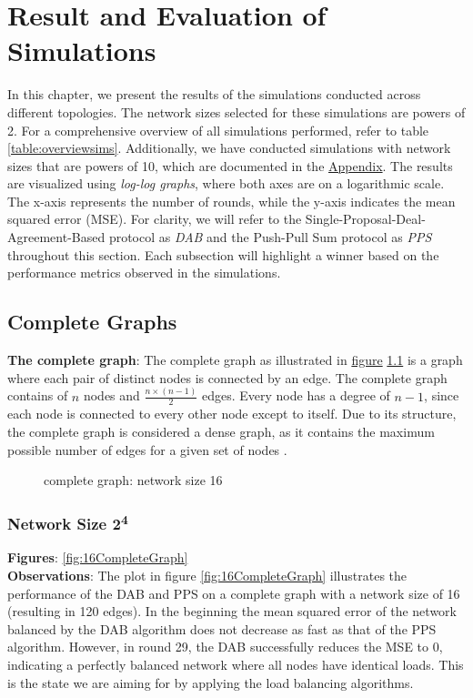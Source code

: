 \chapter{Result and Evaluation of Simulations}\label{chap:results}
In this chapter, we present the results of the simulations conducted across different topologies. The network sizes selected for these simulations are powers of 2. For a comprehensive overview of all simulations performed, refer to table \ref{table:overviewsims}. Additionally, we have conducted simulations with network sizes that are powers of 10, which are documented in the \hyperref[chap:appendix]{Appendix}.
The results are visualized using \textit{log-log graphs}, where both axes are on a logarithmic scale. The x-axis represents the number of rounds, while the y-axis indicates the mean squared error (MSE). For clarity, we will refer to the Single-Proposal-Deal-Agreement-Based protocol as \textit{DAB} and the Push-Pull Sum protocol as \textit{PPS} throughout this section. Each subsection will highlight a winner based on the performance metrics observed in the simulations.

\section{Complete Graphs}
\textbf{The complete graph}: The complete graph as illustrated in \hyperref[fig:completegraphDemo]{figure} \ref{fig:completegraphDemo} is a graph where each pair of distinct nodes is connected by an edge. The complete graph contains of $n$ nodes and $\frac{n\times(n-1)}{2}$ edges. Every node has a degree of $n-1$, since each node is connected to every other node except to itself. Due to its structure, the complete graph is considered a dense graph, as it contains the maximum possible number of edges for a given set of nodes \cite{GraphTheorySchindelhaauer2021}.
\begin{figure}[H]
    \centering
    
    \caption{complete graph: network size 16}
    \label{fig:completegraphDemo}
\end{figure}
\subsection{Network Size 2\textsuperscript{4}}
\textbf{Figures}: \ref{fig:16CompleteGraph}\\
\textbf{Observations}: The plot in figure \ref{fig:16CompleteGraph} illustrates the performance of the DAB and PPS on a complete graph with a network size of 16 (resulting in 120 edges). In the beginning the mean squared error of the network balanced by the DAB algorithm does not decrease as fast as that of the PPS algorithm. However, in round 29, the DAB successfully reduces the MSE to 0, indicating a perfectly balanced network where all nodes have identical loads. This is the state we are aiming for by applying the load balancing algorithms.


